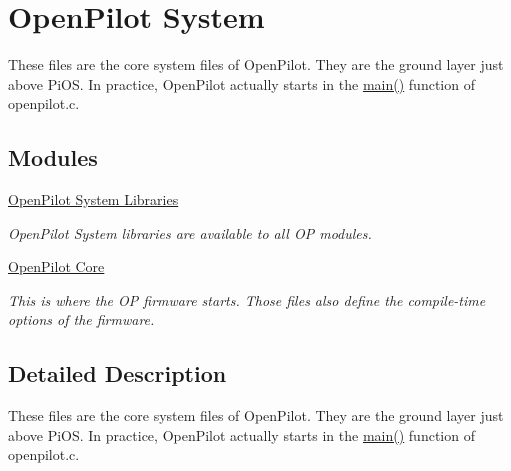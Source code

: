 \hypertarget{group___open_pilot_system}{\section{Open\-Pilot System}
\label{group___open_pilot_system}
}


These files are the core system files of Open\-Pilot. They are the ground layer just above Pi\-O\-S. In practice, Open\-Pilot actually starts in the \hyperlink{_libraries_2_py_mite_2platform_2desktop_2main_8c_gae66f6b31b5ad750f1fe042a706a4e3d4}{main()} function of openpilot.\-c.  


\subsection*{Modules}
\begin{DoxyCompactItemize}
\item 
\hyperlink{group___open_pilot_libraries}{Open\-Pilot System Libraries}
\begin{DoxyCompactList}\small\item\em Open\-Pilot System libraries are available to all O\-P modules. \end{DoxyCompactList}\item 
\hyperlink{group___open_pilot_core}{Open\-Pilot Core}
\begin{DoxyCompactList}\small\item\em This is where the O\-P firmware starts. Those files also define the compile-\/time options of the firmware. \end{DoxyCompactList}\end{DoxyCompactItemize}


\subsection{Detailed Description}
These files are the core system files of Open\-Pilot. They are the ground layer just above Pi\-O\-S. In practice, Open\-Pilot actually starts in the \hyperlink{_libraries_2_py_mite_2platform_2desktop_2main_8c_gae66f6b31b5ad750f1fe042a706a4e3d4}{main()} function of openpilot.\-c. 